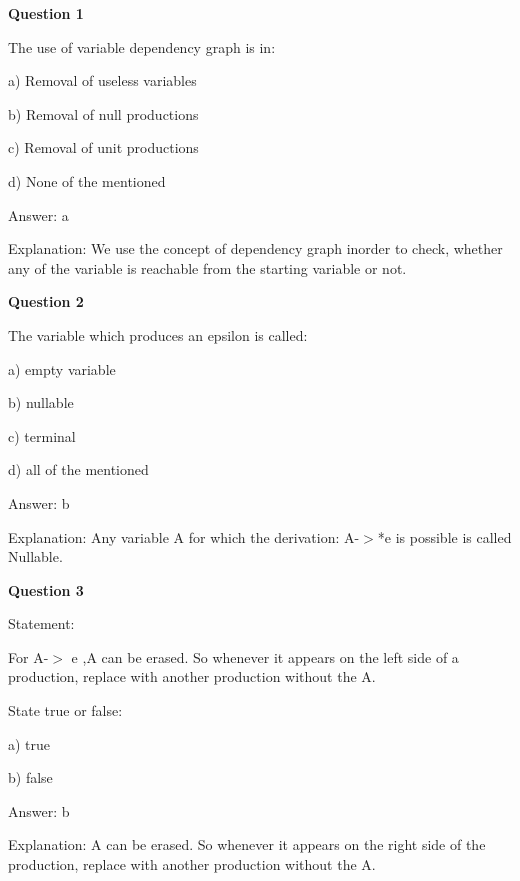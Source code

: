 \documentclass{article}
\begin{document}
\begin{mdframed}[linewidth=1pt, roundcorner=5pt, linecolor=gray!30, backgroundcolor=gray!5]
\textbf{Question 1} 

The use of variable dependency graph is in:

a) Removal of useless variables

b) Removal of null productions

c) Removal of unit productions

d) None of the mentioned
\vspace{5pt} \par
\begin{tcolorbox}[colback=green!5, colframe=green!40!black, title=Solution]
Answer: a

Explanation: We use the concept of dependency graph inorder to check, whether any of the variable is reachable from the starting variable or not.
\end{tcolorbox}
\end{mdframed}

\begin{mdframed}[linewidth=1pt, roundcorner=5pt, linecolor=gray!30, backgroundcolor=gray!5]
\textbf{Question 2} 

The variable which produces an epsilon is called:

a) empty variable

b) nullable

c) terminal

d) all of the mentioned
\vspace{5pt} \par
\begin{tcolorbox}[colback=green!5, colframe=green!40!black, title=Solution]
Answer: b

Explanation: Any variable A for which the derivation: A-$>$*e is possible is called Nullable.
\end{tcolorbox}
\end{mdframed}

\begin{mdframed}[linewidth=1pt, roundcorner=5pt, linecolor=gray!30, backgroundcolor=gray!5]
\textbf{Question 3} 

Statement:

For A-$>$ e ,A can be erased. So whenever it appears on the left side of a production, replace with another production without the A.

State true or false:

a) true

b) false
\vspace{5pt} \par
\begin{tcolorbox}[colback=green!5, colframe=green!40!black, title=Solution]
Answer: b

Explanation:  A can be erased. So whenever it appears on the right side of the production, replace with another production without the A.
\end{tcolorbox}
\end{mdframed}
\newpage
\end{document}
